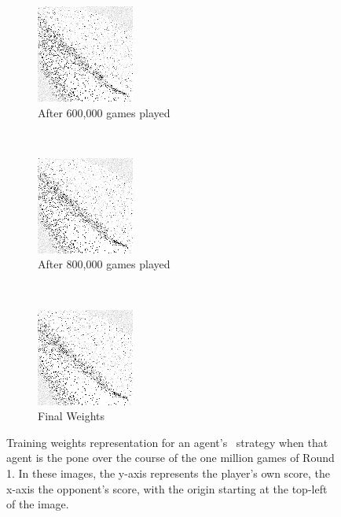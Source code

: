 \begin{figure}
	\begin{subfigure}[t]{0.3\textwidth}
	\centering
	\includegraphics[width=\stratgraphwidth]{images/findings/round1/flipbook_d.png}
	\caption{After 600,000 games played}
	\end{subfigure}
	~
	\begin{subfigure}[t]{0.3\textwidth}
	\centering
	\includegraphics[width=\stratgraphwidth]{images/findings/round1/flipbook_e.png}
	\caption{After 800,000 games played}
	\end{subfigure}
	~
	\begin{subfigure}[t]{0.3\textwidth}
	\centering
	\includegraphics[width=\stratgraphwidth]{images/findings/round1/flipbook_f.png}
	\caption{Final Weights}
	\end{subfigure}

\caption{%
	Training weights representation for an agent's \handmaxavg\
	strategy when that agent is the pone
	over the course of the one million games of Round 1.
	In these images, the y-axis represents the player's own score,
	the x-axis the opponent's score,
	with the origin starting at the top-left of the image.
}
\label{fig_r1-flip}
\end{figure}
